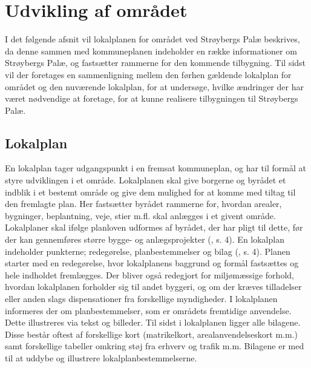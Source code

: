 \chapter{Udvikling af området}
I det følgende afsnit vil lokalplanen for området ved Strøybergs Palæ beskrives, da denne sammen med kommuneplanen indeholder en række informationer om Strøybergs Palæ, og fastsætter rammerne for den kommende tilbygning. 
\newline \indent{     }   Til sidst vil der foretages en sammenligning mellem den førhen gældende lokalplan for området og den nuværende lokalplan, for at undersøge, hvilke ændringer der har været nødvendige at foretage, for at kunne realisere tilbygningen til Strøybergs Palæ.

\section{Lokalplan}
En lokalplan tager udgangspunkt i en fremsat kommuneplan, og har til formål at styre udviklingen i et område. Lokalplanen skal give borgerne og byrådet et indblik i et bestemt område og give dem mulighed for at komme med tiltag til den fremlagte plan. Her fastsætter byrådet rammerne for, hvordan arealer, bygninger, beplantning, veje, stier m.fl. skal anlægges i et givent område. Lokalplaner skal ifølge planloven udformes af byrådet, der har pligt til dette, før der kan gennemføres større bygge- og anlægsprojekter (\citep{lokalplan}, s. 4).
\newline
\newline
En lokalplan indeholder punkterne; redegørelse, planbestemmelser og bilag (\citep{lokalplan}, s. 4).
\newline \indent{     }  Planen starter med en redegørelse, hvor lokalplanens baggrund og formål fastsættes og hele indholdet fremlægges. Der bliver også redegjort for miljømæssige forhold, hvordan lokalplanen forholder sig til andet byggeri, og om der kræves tilladelser eller anden slags dispensationer fra forskellige myndigheder.  
\newline \indent{     }   I lokalplanen informeres der om planbestemmelser, som er områdets fremtidige anvendelse. Dette illustreres via tekst og billeder.
\newline \indent{     }  Til sidst i lokalplanen ligger alle bilagene. Disse består oftest af forskellige kort (matrikelkort, arealanvendelseskort m.m.) samt forskellige tabeller omkring støj fra erhverv og trafik m.m. Bilagene er med til at uddybe og illustrere lokalplanbestemmelserne.
\newline
